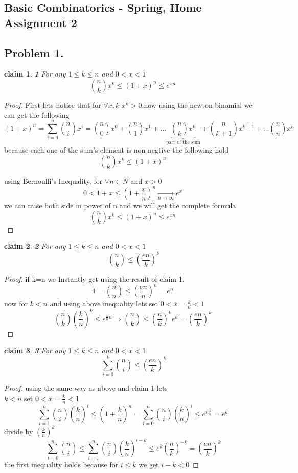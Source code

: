 \documentclass[12pt]{article}
\newtheorem*{claim*}{claim}
\begin{document}
\begin{center}
\section*{Basic Combinatorics - Spring, Home Assignment 2}
\end{center}
\subsection*{Problem 1.}
\begin{claim*}\textbf{1} For any $1 \leq k \leq n$ and $0 < x < 1$\[\binom{n}{k}  x ^ k \leq (1 + x) ^ n \leq e ^ {xn}\]
\end{claim*}
\begin{proof}
 First lets notice that for $\forall x,k$ $x^k>0$.now using the newton binomial we can get the following
 \[
 (1 + x) ^ n=\sum^n_{i=0}\binom{n}{i}x^i=\binom{n}{0}x^0+\binom{n}{1}x^1+\dots \underbrace{\binom{n}{k}x^k}_{\text{part of the sum}}+\binom{n}{k+1}x^{k+1}+\dots
 \binom{n}{n}x^n
 \] 
because each one of the sum's element is non negtive 
the following hold
\[ \binom{n}{k}x^k \leq (1 + x) ^ n
\]

using Bernoulli's Inequality, for $\forall n \in N $ and $x>0$
\[0< 1+x\leq\left(1+\frac{x}{n}\right)^n\xrightarrow [n\to\infty]{} e^x
\]
we can raise both side in power of n and we will get the complete formula
\[\binom{n}{k}  x ^ k \leq (1 + x) ^ n \leq e ^ {xn}\]
\end{proof}
\begin{claim*}\textbf{2} For any $1 \leq k \leq n$ and $0 < x < 1$\[\ \binom{n}{k} \leq (\frac{en}{k})^k\]
\end{claim*}
\begin{proof}

if k=n we Instantly get using the result of claim 1.
\[1=\binom{n}{n} \leq (\frac{en}{n})^n=e^n\]
now for $k<n$ and using above inequality lets set $0<x=\frac{k}{n}<1$
\[\binom{n}{k}  (\frac{k}{n} )^ k \leq e ^ {\frac{k}{n}n}
\Rightarrow \binom{n}{k}\leq (\frac{n}{k} )^ ke^k=(\frac{en}{k} )^ k
\]
\end{proof}
\begin{claim*}\textbf{3} For any $1 \leq k \leq n$ and $0 < x < 1$
\[\ \sum_{i=0}^k\binom{n}{i} \leq (\frac{en}{k})^k\]
\end{claim*}
\begin{proof}
using the same way as above and claim 1 lets \\$k<n$  set $0<x=\frac{k}{n}<1$
\[\sum^n_{i=1}\binom{n}{i}(\frac{k}{n})^i\leq(1+\frac{k}{n})^n =\sum^n_{i=0}\binom{n}{i}(\frac{k}{n})^i \leq   e^{n\frac{k}{n}}=e^k
\]
divide by $(\frac{k}{n})^k$
\[
\ \sum^n_{i=0}\binom{n}{i} \leq \sum^n_{i=1}\binom{n}{i}(\frac{k}{n})^{i-k}\leq  e^k(\frac{n}{k})^{-k}=(\frac{en}{k})^k
\]
the first inequality holds because for $i \leq k$ we get $i-k<0$
\end{proof}
\end{document}
